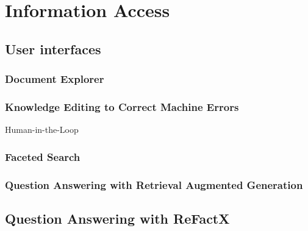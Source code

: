 \chapter{Information Access}
\section{User interfaces}
\subsection{Document Explorer}
\subsection{Knowledge Editing to Correct Machine Errors}
Human-in-the-Loop
\subsection{Faceted Search}
\subsection{Question Answering with Retrieval Augmented Generation}

\section{Question Answering with ReFactX}